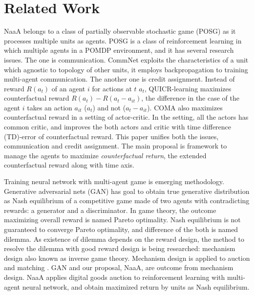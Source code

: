 \section{Related Work}
NaaA belongs to a class of partially observable stochastic game (POSG) \citep{hansen2004dynamic} as it processes multiple units as agents.
POSG is a class of reinforcement learning in which multiple agents in a POMDP environment, and it has several research issues.
The one is communication.
CommNet \citep{sukhbaatar2016learning} exploits the characteristics of a unit which agnostic to topology of other units, it employs backpropagation to training multi-agent communication.
The another one is credit assignment.
Instead of reward $R(a_t)$ of an agent $i$ for actions at $t$ $a_t$, 
QUICR-learning \citep{agogino2006quicr} maximizes counterfactual reward $R(a_t) - R(a_t - a_{it})$, the difference in the case of the agent $i$ takes an action $a_{it}$ ($a_t$) and not ($a_t-a_{it}$).
COMA \citep{foerster2017counterfactual} also maximizes counterfactual reward in a setting of actor-critic.
In the setting, all the actors has common critic, and improves the both actors and critic with time difference (TD)-error of counterfactual reward.
This paper unifies both the issues, communication and credit assignment.
The main proposal is framework to manage the agents to maximize {\em counterfactual return}, the extended counterfactual reward along with time axis.

Training neural network with multi-agent game is emerging methodology.
Generative adversarial nets (GAN) \citep{goodfellow2014generative} has goal to obtain true generative distribution as Nash equilibrium of a competitive game made of two agents with contradicting rewards: a generator and a discriminator. 
In game theory, the outcome maximizing overall reward is named Pareto optimality.
Nash equilibrium is not guaranteed to converge Pareto optimality, and difference of the both is named dilemma.
As existence of dilemma depends on the reward design, the method to resolve the dilemma with good reward design is being researched: mechanism design \citep{myerson1983mechanism} also known as inverse game theory.
Mechanism design is applied to auction \citep{vickrey1961counterspeculation} and matching \citep{gale1962college}.
GAN and our proposal, NaaA, are outcome from mechanism design.
NaaA applies digital goods auction \citep{guruswami2005profit} to reinforcement learning with multi-agent neural network, 
and obtain maximized return by units as Nash equilibrium.


